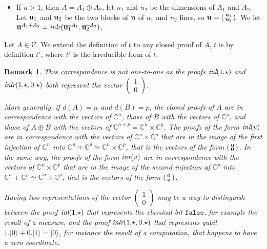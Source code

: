\documentclass[screen, sigconf,authorversion,nonacm]{acmart}
\theoremstyle{acmdefinition}
\newtheorem{remark}[theorem]{Remark}}
\numberwithin{equation}{section}
\newcommand\ket[1]{\ensuremath{|{#1}\rangle}}
\newcommand\inl{\mbox{\it inl}}
\newcommand\inr{\mbox{\it inr}}
\newcommand\inlr{\mbox{\it inlr}}
\newcommand\boolzero{{\mathtt{false}}}
\begin{document}
\begin{definition}[Correspondance]
\begin{itemize}
\item If $n > 1$, then $A = A_1 \oplus A_2$, let $n_1$ and $n_2$ be
  the dimensions of $A_1$ and $A_2$.  Let ${\bf u}_1$ and ${\bf u}_2$
  be the two blocks of ${\bf u}$ of $n_1$ and $n_2$ lines, so ${\bf u}
  = \left(\begin{smallmatrix} {\bf u}_1\\ {\bf
      u}_2\end{smallmatrix}\right)$.  We let $\overline{\bf u}^{A_1
      \oplus A_2} = \inlr(\overline{{\bf u}_1}^{A_1}, \overline{{\bf
        u}_2}^{A_2})$.
\end{itemize}
\end{definition}

Let $A \in \mathcal{V}$.  We extend the definition of $\underline{t}$
to any closed proof of $A$, $\underline{t}$ is by definition
$\underline{t'}$, where $t'$ is the irreducible form of $t$.

\begin{remark}
This correspondence is not one-to-one as the proofs $\inl(1.\star)$
and $\inlr(1.\star,0.\star)$ both represent the vector
$\left(\begin{smallmatrix} 1 \\ 0 \end{smallmatrix}\right)$.

More generally, if $d(A) = n$ and $d(B) = p$, the closed proofs of $A$
are in correspondence with the vectors of ${\mathbb C}^n$, those of
$B$ with the vectors of ${\mathbb C}^p$, and those of $A \oplus B$
with the vectors of ${\mathbb C}^{n+p} = {\mathbb C}^n \times {\mathbb
  C}^p$.  The proofs of the form $\inl(u)$ are in correspondence with
the vectors of ${\mathbb C}^n \times {\mathbb C}^p$ that are in the
image of the first injection of ${\mathbb C}^n$ into ${\mathbb C}^n +
{\mathbb C}^p\simeq{\mathbb C}^n \times {\mathbb C}^p$, that is the
vectors of the form $\left(\begin{smallmatrix} {\bf u} \\ {\bf
    0} \end{smallmatrix}\right)$.  In the same way, the proofs of the
form $\inr(v)$ are in correspondence with the vectors of ${\mathbb
  C}^n \times {\mathbb C}^p$ that are in the image of the second
injection of ${\mathbb C}^p$ into ${\mathbb C}^n + {\mathbb
  C}^p\simeq{\mathbb C}^n \times {\mathbb C}^p$, that is the vectors
of the form $\left(\begin{smallmatrix} {\bf 0} \\ {\bf
    u} \end{smallmatrix}\right)$.

Having two representations of the vector $\left(\begin{smallmatrix} 1
  \\ 0 \end{smallmatrix}\right)$ may be a way to distinguish between
the proof $\inl(1.\star)$ that represents the classical bit
$\boolzero$, for example the result of a measure, and the proof
$\inlr(1.\star,0.\star)$ that represents qubit $1. \ket{0} +
0. \ket{1} = \ket{0}$, for instance the result of a computation, that
happens to have a zero coordinate.
\end{remark}
\end{document}

